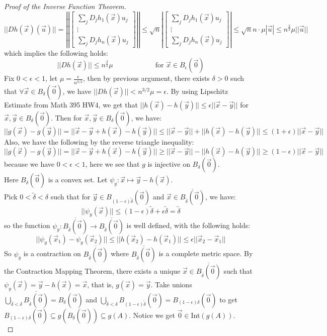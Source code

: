 \documentclass[11pt,oneside]{book}
\theoremstyle{break}
\theoremstyle{break}
\begin{document}
\begin{proof}[Proof of the Inverse Function Theorem]
$$||Dh(\vec{x})(\vec{u})||= \left|\left|\begin{bmatrix}
\sum_j D_jh_1(\vec{x})u_j \\ \vdots \\ \sum_j D_j h_n (\vec{x})u_j
\end{bmatrix}\right|\right|\leq \sqrt{n} \left|\begin{bmatrix}
\sum_j D_jh_1(\vec{x})u_j \\ \vdots \\ \sum_j D_j h_n (\vec{x})u_j
\end{bmatrix}\right| \leq \sqrt{n}n\cdot \mu |\vec{u}|\leq n^\frac{3}{2}\mu ||\vec{u}||$$
which implies the following holds:
$$||Dh(\vec{x})|| \leq n^{\frac{3}{2}} \mu \qquad\qquad\qquad\text{for }\vec{x} \in B_\epsilon(\vec{0})$$
Fix $0 <\epsilon <1$, let $\mu = \frac{\epsilon}{n^{3/2}}$, then by previous argument, there exists $\delta>0$ such that $\forall \vec{x}\in B_\delta(\vec{0})$, we have $||Dh(\vec{x})||<n^{3/2}\mu = \epsilon$. By using Lipschitz Estimate from Math 395 HW4, we get that $||h(\vec{x}) -h(\vec{y})|| \leq \epsilon ||\vec{x}-\vec{y}||$ for $\vec{x},\vec{y}\in B_\delta(\vec{0})$. Then for $\vec{x},\vec{y}\in B_\delta(\vec{0})$, we have: $$||g(\vec{x})-g(\vec{y})|| = ||\vec{x}-\vec{y} +h(\vec{x})-h(\vec{y})||\leq ||\vec{x}-\vec{y}|| + ||h(\vec{x}) - h(\vec{y})|| \leq (1+\epsilon) ||\vec{x}-\vec{y}||$$
Also, we have the following by the reverse triangle inequality:
$$||g(\vec{x})-g(\vec{y})|| = ||\vec{x}-\vec{y}+h(\vec{x})-h(\vec{y})|| \geq ||\vec{x}-\vec{y}|| - ||h(\vec{x})-h(\vec{y})|| \geq (1-\epsilon)||\vec{x}-\vec{y}||$$
because we have $0< \epsilon<1$, here we see that $g$ is injective on $B_\delta(\vec{0})$.\\ 
Here $B_\delta(\vec{0})$ is a convex set. Let $\psi_y : \vec{x}\mapsto \vec{y}-h(\vec{x})$.\\ Pick $0 < \widetilde{\delta} < \delta$ such that for $\vec{y}\in B_{(1-\epsilon)\widetilde{\delta}}(\vec{0})$ and $\vec{x}\in \overline{B_{\widetilde{\delta}}(\vec{0})}$, we have: $$||\psi_y(\vec{x})|| \leq (1-\epsilon)\widetilde{\delta} + \epsilon\widetilde{\delta} = \widetilde{\delta}$$
so the function $\psi_y:\overline{B_{\widetilde{\delta}}(\vec{0})} \to \overline{B_{\widetilde{\delta}}(\vec{0})}$ is well defined, with the following holds:
$$||\psi_y(\vec{x}_1) - \psi_y(\vec{x}_2) || \leq ||h(\vec{x}_2)-h(\vec{x}_1)|| \leq \epsilon||\vec{x}_2-\vec{x}_1||$$
So $\psi_y$ is a contraction on $\overline{B_{\widetilde{\delta}}(\vec{0})}$ where $\overline{B_{\widetilde{\delta}}(\vec{0})}$ is a complete metric space. By the Contraction Mapping Theorem, there exists a unique $\vec{x}\in \overline{B_{\widetilde{\delta}}(\vec{0})}$ such that $\psi_y(\vec{x})= \vec{y}-h(\vec{x}) = \vec{x}$, that is, $g(\vec{x}) = \vec{y}$. Take unions $\bigcup_{\widetilde{\delta} < \delta}\overline{B_{\widetilde{\delta}}(\vec{0})} = B_\delta(\vec{0})$ and $\bigcup_{\widetilde{\delta} < \delta}B_{(1-\epsilon)\widetilde{\delta}}(\vec{0}) = B_{(1-\epsilon)\delta}(\vec{0})$ to get $B_{(1-\epsilon)\delta}(\vec{0}) \subseteq g(B_{\delta}(\vec{0}))\subseteq g(A)$. Notice we get $\vec{0} \in $Int$(g(A))$. \\


\end{proof}
\end{document}
